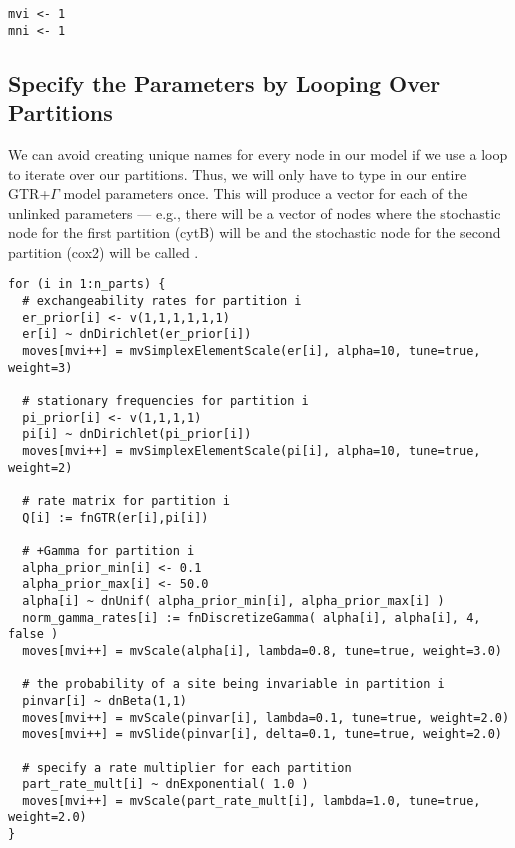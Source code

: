 {\tt \begin{snugshade*}
\begin{lstlisting}
mvi <- 1
mni <- 1
\end{lstlisting}
\end{snugshade*}}


\subsection{Specify the Parameters by Looping Over Partitions}

We can avoid creating unique names for every node in our model if we use a  loop to iterate over our partitions. Thus, we will only have to type in our entire GTR+$\Gamma$ model parameters once. 
This will produce a vector for each of the unlinked parameters --- e.g., there will be a vector of  nodes where the stochastic node for the first partition (cytB) will be  and the stochastic node for the second partition (cox2) will be called .
{\tt \small \begin{snugshade*}
\begin{lstlisting}
for (i in 1:n_parts) {
  # exchangeability rates for partition i
  er_prior[i] <- v(1,1,1,1,1,1)
  er[i] ~ dnDirichlet(er_prior[i])
  moves[mvi++] = mvSimplexElementScale(er[i], alpha=10, tune=true, weight=3) 

  # stationary frequencies for partition i
  pi_prior[i] <- v(1,1,1,1)
  pi[i] ~ dnDirichlet(pi_prior[i])
  moves[mvi++] = mvSimplexElementScale(pi[i], alpha=10, tune=true, weight=2) 

  # rate matrix for partition i
  Q[i] := fnGTR(er[i],pi[i]) 

  # +Gamma for partition i
  alpha_prior_min[i] <- 0.1
  alpha_prior_max[i] <- 50.0
  alpha[i] ~ dnUnif( alpha_prior_min[i], alpha_prior_max[i] )
  norm_gamma_rates[i] := fnDiscretizeGamma( alpha[i], alpha[i], 4, false )
  moves[mvi++] = mvScale(alpha[i], lambda=0.8, tune=true, weight=3.0)

  # the probability of a site being invariable in partition i
  pinvar[i] ~ dnBeta(1,1)
  moves[mvi++] = mvScale(pinvar[i], lambda=0.1, tune=true, weight=2.0)
  moves[mvi++] = mvSlide(pinvar[i], delta=0.1, tune=true, weight=2.0)

  # specify a rate multiplier for each partition
  part_rate_mult[i] ~ dnExponential( 1.0 )
  moves[mvi++] = mvScale(part_rate_mult[i], lambda=1.0, tune=true, weight=2.0)
}

\end{lstlisting}
\end{snugshade*}}

